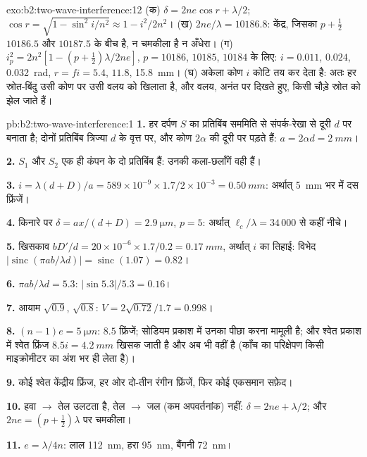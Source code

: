 \begin{solution}{exo:b2:two-wave-interference:12}
(क) $\delta = 2ne\cos r + \lambda/2$; $\cos r = \sqrt{1 - \sin^2i/n^2} \approx 1 - i^2/2n^2$।
(ख) $2ne/\lambda = 10186.8$: केंद्र, जिसका $p + \tfrac12$ $10186.5$ और
$10187.5$ के बीच है, न चमकीला है न अँधेरा। (ग) $i_p^2 = 2n^2[1 - (p + \tfrac12)\lambda/
2ne]$, $p = 10186$, $10185$, $10184$ के लिए: $i = 0.011$, $0.024$, \qty{0.032}{rad}, $r = fi
= 5.4$, $11.8$, \qty{15.8}{mm}। (घ) अकेला कोण $i$ कोटि तय कर देता है: अतः हर
स्रोत-बिंदु उसी कोण पर उसी वलय को खिलाता है, और वलय, अनंत पर
दिखते हुए, किसी चौड़े स्रोत को झेल जाते हैं।
\end{solution}

\begin{solution}{pb:b2:two-wave-interference:1}
\textbf{1.} हर दर्पण $S$ का प्रतिबिंब सममिति से संपर्क-रेखा से दूरी $d$ पर
बनाता है; दोनों प्रतिबिंब त्रिज्या $d$ के वृत्त पर, और
कोण $2\alpha$ की दूरी पर पड़ते हैं: $a = 2\alpha d = \qty{2}{mm}$।

\textbf{2.} $S_1$ और $S_2$ एक ही कंपन के दो प्रतिबिंब हैं: उनकी
कला-छलाँगें वही हैं।

\textbf{3.} $i = \lambda(d + D)/a = 589 \times 10^{-9} \times 1.7/2 \times 10^{-3} = \qty{0.50}{mm}$: अर्थात् \qty{5}{mm}
भर में दस फ्रिंजें।

\textbf{4.} किनारे पर $\delta = ax/(d + D) = \qty{2.9}{\micro m}$, $p = 5$: अर्थात्
$\ell_c/\lambda = 34\,000$ से कहीं नीचे।

\textbf{5.} खिसकाव $bD'/d = 20 \times 10^{-6} \times 1.7/0.2 = \qty{0.17}{mm}$, अर्थात्
$i$ का तिहाई: विभेद $|\operatorname{sinc}(\pi ab/\lambda d)| = \operatorname{sinc}(1.07) = 0.82$।

\textbf{6.} $\pi ab/\lambda d = 5.3$: $|\sin5.3|/5.3 = 0.16$।

\textbf{7.} आयाम $\sqrt{0.9}$, $\sqrt{0.8}$: $V = 2\sqrt{0.72}/1.7 = 0.998$।

\textbf{8.} $(n - 1)e = \qty{5}{\micro m}$: $8.5$ फ्रिंजें; सोडियम प्रकाश में उनका
पीछा करना मामूली है; और श्वेत प्रकाश में श्वेत फ्रिंज $8.5i = \qty{4.2}{mm}$ खिसक
जाती है और अब भी वहीं है (काँच का परिक्षेपण किसी माइक्रोमीटर का
अंश भर ही लेता है)।

\textbf{9.} कोई श्वेत केंद्रीय फ्रिंज, हर ओर दो-तीन रंगीन फ्रिंजें,
फिर कोई एकसमान सफ़ेद।

\textbf{10.} हवा $\to$ तेल उलटता है, तेल $\to$ जल (कम अपवर्तनांक) नहीं:
$\delta = 2ne + \lambda/2$; और $2ne = (p + \tfrac12)\lambda$ पर चमकीला।

\textbf{11.} $e = \lambda/4n$: लाल \qty{112}{nm}, हरा \qty{95}{nm}, बैंगनी \qty{72}{nm}।


\end{solution}
